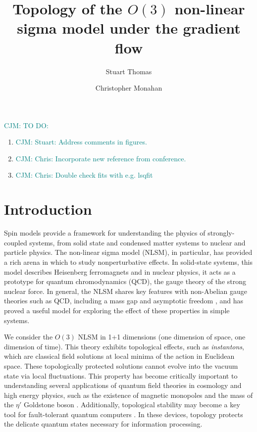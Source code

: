 \documentclass[a4paper,11pt]{article}
\title{Topology of the $O(3)$ non-linear sigma model under the gradient flow}
\author*[a]{Stuart Thomas}
\author[a,b]{Christopher Monahan}
\affiliation[a]{Department of Physics, William \& Mary, \\ 300 Ukrop Way, Williamsburg, VA, USA} %
\affiliation[b]{Thomas Jefferson National Accelerator Facility, \\ 12000 Jefferson Avenue, Newport News, VA, USA} %
\newcommand\chris[1]{\textcolor{teal}{CJM: #1}}
\begin{document}
\maketitle

\chris{TO DO:}
\begin{enumerate}
 \item \chris{Stuart: Address comments in figures.}
 \item \chris{Chris: Incorporate new reference from conference.}
 \item \chris{Chris: Double check fits with e.g. lsqfit}
\end{enumerate}

\section{Introduction}
\label{sec:introduction}
Spin models provide a framework for understanding the physics of strongly-coupled systems, from solid state and condensed matter systems to nuclear and particle physics. The non-linear sigma model (NLSM), in particular, has provided a rich arena in which to study nonperturbative effects. In solid-state systems, this model describes Heisenberg ferromagnets \cite{callan1985} and in nuclear physics, it acts as a prototype for quantum chromodynamics (QCD), the gauge theory of the strong nuclear force. In general, the NLSM shares key features with non-Abelian gauge theories such as QCD, including a mass gap and asymptotic freedom \cite{polyakov1975}, and has proved a useful model for exploring the effect of these properties in simple systems.

We consider the $O(3)$ NLSM in 1+1 dimensions (one dimension of space, one dimension of time). This theory exhibits topological effects, such as \textit{instantons}, which are classical field solutions at local minima of the action in Euclidean space. These topologically protected solutions cannot evolve into the vacuum state via local fluctuations. This property has become critically important to understanding several applications of quantum field theories in cosmology and high energy physics, such as the existence of magnetic monopoles \cite{goddard1986} and the mass of the $\eta'$ Goldstone boson \cite{witten1979, veneziano1979}. Additionally, topological stability may become a key tool for fault-tolerant quantum computers \cite{kitaev1997}. In these devices, topology protects the delicate quantum states necessary for information processing.
\end{document}
